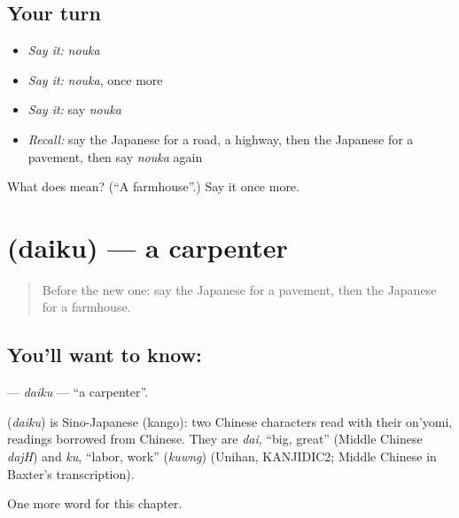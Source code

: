 \subsection*{Your turn}
\begin{itemize}
\raggedright
  \item \emph{Say it:} \emph{nouka}
  \item \emph{Say it:} \emph{nouka}, once more
  \item \emph{Say it:} say \emph{nouka}
  \item \emph{Recall:} say the Japanese for a road, a highway, then the Japanese for a pavement, then say \emph{nouka} again
\end{itemize}

\begin{tcolorbox}[breakable,colback=teal!4,colframe=teal!35!black,title={Before you move on}]
What does  mean? (\textquotedblleft{}A farmhouse\textquotedblright{}.) Say it once more.
\end{tcolorbox}
\section[\texorpdfstring{\ja{だいく} (daiku)}{だいく (daiku)}]{ (daiku) — a carpenter}

\label{lesson:JA-C112-daiku}



\begin{quote}
Before the new one: say the Japanese for a pavement, then the Japanese for a farmhouse.
\end{quote}

\subsection*{You'll want to know: }
\textbf{} — \emph{daiku} — \textquotedblleft{}a carpenter\textquotedblright{}.

\begin{cousinweb}
\textbf{} (\emph{daiku}) is Sino-Japanese (kango): two Chinese characters read with their on'yomi, readings borrowed from Chinese. They are \emph{dai}, \textquotedblleft{}big, great\textquotedblright{} (Middle Chinese \emph{dajH}) and \emph{ku}, \textquotedblleft{}labor, work\textquotedblright{} (\emph{kuwng}) (Unihan, KANJIDIC2; Middle Chinese in Baxter's transcription).
\end{cousinweb}

\begin{grammarlens}[title={What you've built}]
One more word for this chapter.
\end{grammarlens}

